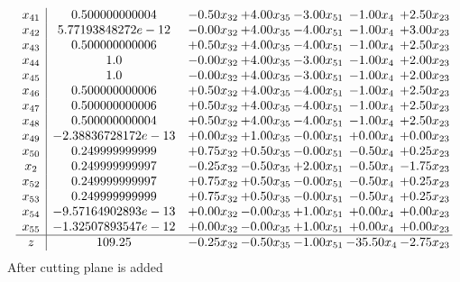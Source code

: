 \documentclass[8pt]{article}
\begin{document}
\[\begin{array}{c| c c@{\hskip 2pt} c@{\hskip 2pt} c@{\hskip 2pt} c@{\hskip 2pt} c@{\hskip 2pt} }
 x_{41}   &  0.500000000004 & -0.50 x_{32} & +  4.00 x_{35} & -3.00 x_{51} & -1.00 x_{4} & +  2.50 x_{23}\\
 x_{42}   &  5.77193848272e-12 & -0.00 x_{32} & +  4.00 x_{35} & -4.00 x_{51} & -1.00 x_{4} & +  3.00 x_{23}\\
 x_{43}   &  0.500000000006 & +  0.50 x_{32} & +  4.00 x_{35} & -4.00 x_{51} & -1.00 x_{4} & +  2.50 x_{23}\\
 x_{44}   &  1.0 & -0.00 x_{32} & +  4.00 x_{35} & -3.00 x_{51} & -1.00 x_{4} & +  2.00 x_{23}\\
 x_{45}   &  1.0 & -0.00 x_{32} & +  4.00 x_{35} & -3.00 x_{51} & -1.00 x_{4} & +  2.00 x_{23}\\
 x_{46}   &  0.500000000006 & +  0.50 x_{32} & +  4.00 x_{35} & -4.00 x_{51} & -1.00 x_{4} & +  2.50 x_{23}\\
 x_{47}   &  0.500000000006 & +  0.50 x_{32} & +  4.00 x_{35} & -4.00 x_{51} & -1.00 x_{4} & +  2.50 x_{23}\\
 x_{48}   &  0.500000000004 & +  0.50 x_{32} & +  4.00 x_{35} & -4.00 x_{51} & -1.00 x_{4} & +  2.50 x_{23}\\
 x_{49}   &  -2.38836728172e-13 & +  0.00 x_{32} & +  1.00 x_{35} & -0.00 x_{51} & +  0.00 x_{4} & +  0.00 x_{23}\\
 x_{50}   &  0.249999999999 & +  0.75 x_{32} & +  0.50 x_{35} & -0.00 x_{51} & -0.50 x_{4} & +  0.25 x_{23}\\
 x_{2}   &  0.249999999997 & -0.25 x_{32} & -0.50 x_{35} & +  2.00 x_{51} & -0.50 x_{4} & -1.75 x_{23}\\
 x_{52}   &  0.249999999997 & +  0.75 x_{32} & +  0.50 x_{35} & -0.00 x_{51} & -0.50 x_{4} & +  0.25 x_{23}\\
 x_{53}   &  0.249999999999 & +  0.75 x_{32} & +  0.50 x_{35} & -0.00 x_{51} & -0.50 x_{4} & +  0.25 x_{23}\\
 x_{54}   &  -9.57164902893e-13 & +  0.00 x_{32} & -0.00 x_{35} & +  1.00 x_{51} & +  0.00 x_{4} & +  0.00 x_{23}\\
 x_{55}   &  -1.32507893547e-12 & +  0.00 x_{32} & -0.00 x_{35} & +  1.00 x_{51} & +  0.00 x_{4} & +  0.00 x_{23}\\
\hline
z    &  109.25 & -0.25 x_{32} & -0.50 x_{35} & -1.00 x_{51} & -35.50 x_{4} & -2.75 x_{23}\\
\end{array}\]
 After cutting plane is added 
\end{document}
